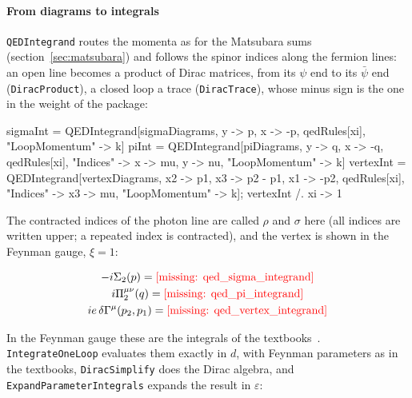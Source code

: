 \documentclass[11pt,a4paper]{article}
\newcommand{\formula}[1]{\IfFileExists{figures/formula_#1.tex}{}{\text{\textcolor{red}{[missing: \detokenize{#1}]}}}}
\newcommand{\pkg}[1]{\texttt{#1}}
\begin{document}
\paragraph{From diagrams to integrals} \pkg{QEDIntegrand} routes the momenta as for the Matsubara sums
(section~\ref{sec:matsubara}) and follows the spinor indices along the fermion lines: an open line becomes a product of
Dirac matrices, from its $\psi$ end to its $\bar\psi$ end (\pkg{DiracProduct}), a closed loop a trace (\pkg{DiracTrace}),
whose minus sign is the one in the weight of the package:
\begin{code}
sigmaInt = QEDIntegrand[sigmaDiagrams, {y -> p, x -> -p}, qedRules[xi],
    "LoopMomentum" -> k]
piInt = QEDIntegrand[piDiagrams, {y -> q, x -> -q}, qedRules[xi],
    "Indices" -> {x -> mu, y -> nu}, "LoopMomentum" -> k]
vertexInt = QEDIntegrand[vertexDiagrams, {x2 -> p1, x3 -> p2 - p1, x1 -> -p2},
    qedRules[xi], "Indices" -> {x3 -> mu}, "LoopMomentum" -> k];
vertexInt /. xi -> 1
\end{code}
The contracted indices of the photon line are called $\rho$ and $\sigma$ here (all indices are written upper; a repeated
index is contracted), and the vertex is shown in the Feynman gauge, $\xi=1$:
\begin{outputbox}
\vspace{-6pt}
\begin{gather*}
-i\Sigma_2(p)=\formula{qed_sigma_integrand}\\
i\Pi_2^{\mu\nu}(q)=\formula{qed_pi_integrand}\\
ie\,\delta\Gamma^\mu(p_2,p_1)=\formula{qed_vertex_integrand}
\end{gather*}
\end{outputbox}
In the Feynman gauge these are the integrals of the textbooks~\cite[sections~7.1, 7.5 and 6.3]{PeskinSchroeder}.
\pkg{IntegrateOneLoop} evaluates them exactly in $d$, with Feynman parameters as in the textbooks, \pkg{DiracSimplify} does the Dirac algebra, and \pkg{ExpandParameterIntegrals} expands
the result in $\varepsilon$:
\end{document}
